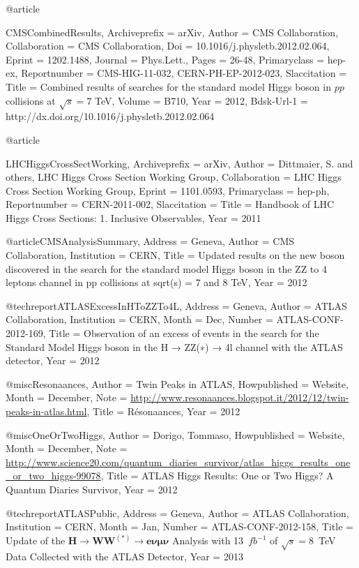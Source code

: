 {{{{@article{CMSCombinedResults,
	Archiveprefix = {arXiv},
	Author = {CMS Collaboration},
	Collaboration = {CMS Collaboration},
	Doi = {10.1016/j.physletb.2012.02.064},
	Eprint = {1202.1488},
	Journal = {Phys.Lett.},
	Pages = {26-48},
	Primaryclass = {hep-ex},
	Reportnumber = {CMS-HIG-11-032, CERN-PH-EP-2012-023},
	Slaccitation = {%
	Title = {{Combined results of searches for the standard model Higgs boson in $pp$ collisions at $\sqrt{s}=7$ TeV}},
	Volume = {B710},
	Year = {2012},
	Bdsk-Url-1 = {http://dx.doi.org/10.1016/j.physletb.2012.02.064}}

@article{LHCHiggsCrossSectWorking,
	Archiveprefix = {arXiv},
	Author = {Dittmaier, S. and others, LHC Higgs Cross Section Working Group},
	Collaboration = {LHC Higgs Cross Section Working Group},
	Eprint = {1101.0593},
	Primaryclass = {hep-ph},
	Reportnumber = {CERN-2011-002},
	Slaccitation = {%
	Title = {{Handbook of LHC Higgs Cross Sections: 1. Inclusive Observables}},
	Year = {2011}}

@article{CMSAnalysisSummary,
	Address = {Geneva},
	Author = {CMS Collaboration},
	Institution = {CERN},
	Title = {Updated results on the new boson discovered in the search for the standard model Higgs boson in the ZZ to 4 leptons channel in pp collisions at sqrt(s) = 7 and 8 TeV},
	Year = {2012}}

@techreport{ATLASExcessInHToZZTo4L,
	Address = {Geneva},
	Author = {ATLAS Collaboration},
	Institution = {CERN},
	Month = {Dec},
	Number = {ATLAS-CONF-2012-169},
	Title = {Observation of an excess of events in the search for the Standard Model Higgs boson in the H → ZZ(∗) → 4l channel with the ATLAS detector},
	Year = {2012}}

@misc{Resonaances,
	Author = {Twin Peaks in ATLAS},
	Howpublished = {Website},
	Month = {December},
	Note = {\url{http://www.resonaances.blogspot.it/2012/12/twin-peaks-in-atlas.html}},
	Title = {R{\'e}sonaances},
	Year = {2012}}

@misc{OneOrTwoHiggs,
	Author = {Dorigo, Tommaso},
	Howpublished = {Website},
	Month = {December},
	Note = {\url{http://www.science20.com/quantum_diaries_survivor/atlas_higgs_results_one_or_two_higgs-99078}},
	Title = {ATLAS Higgs Results: One or Two Higgs? A Quantum Diaries Survivor},
	Year = {2012}}

@techreport{ATLASPublic,
	Address = {Geneva},
	Author = {ATLAS Collaboration},
	Institution = {CERN},
	Month = {Jan},
	Number = {ATLAS-CONF-2012-158},
	Title = {Update of the $\boldsymbol{H\to WW^{(\ast)}\to e\nu\mu\nu}$ Analysis with 13~$fb^{-1}$ of $\sqrt{s} = 8$~TeV Data Collected with the ATLAS Detector},
	Year = {2013}}

}}}}}}
